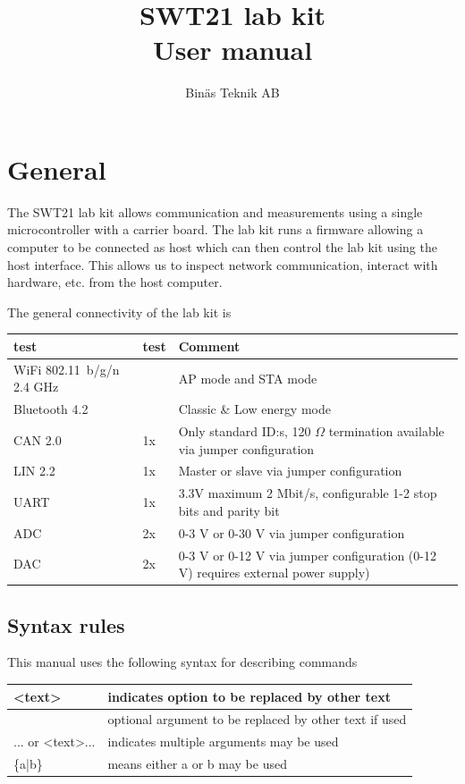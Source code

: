 \documentclass{article}[a4paper]
\title{SWT21 lab kit \\ User manual}
\author{Binäs Teknik AB}
\begin{document}
\maketitle
\tableofcontents
\newpage

\section{General}

The SWT21 lab kit allows communication and measurements using a single
microcontroller with a carrier board. The lab kit runs a firmware allowing a
computer to be connected as host which can then control the lab kit using the
host interface. This allows us to inspect network communication, interact with
hardware, etc. from the host computer.

The general connectivity of the lab kit is

\medskip
\renewcommand{\arraystretch}{1.5}
\noindent
\begin{tabularx}{\textwidth}{|p{2cm}|p{1.5cm}|X|}
\hline
test & test & Comment \\
\hline
WiFi \hbox{802.11 b/g/n} 2.4 GHz &  & AP mode and STA mode \\
\hline
Bluetooth 4.2 & &  Classic \& Low energy mode \\
\hline
CAN 2.0 & 1x & Only standard ID:s, 120 $\Omega$ termination available via jumper
 configuration \\
\hline
LIN 2.2 & 1x & Master or slave via jumper configuration \\
\hline
UART & 1x & 3.3V maximum 2 Mbit/s, configurable 1-2 stop bits and parity bit \\
\hline
ADC & 2x & 0-3 V or 0-30 V via jumper configuration \\
\hline
DAC & 2x & 0-3 V or 0-12 V via jumper configuration (0-12 V) requires external power supply)\\
\hline
\end{tabularx}


\subsection{Syntax rules}
This manual uses the following syntax for describing commands

\medskip
\noindent
\begin{tabularx}{\textwidth}{|p{4cm}|X|}
\hline
<text> & indicates option to be replaced by other text \\
\hline
[text] & optional argument to be replaced by other text if used\\
\hline
[text]... or <text>... & indicates multiple arguments may be used \\
\hline
\{a|b\} & means either a or b may be used \\
\hline
\end{tabularx}
\end{document}
